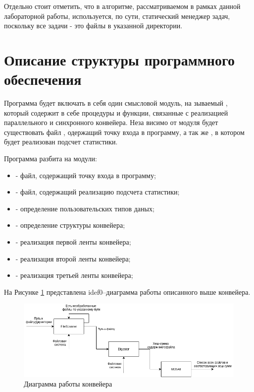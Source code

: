 Отдельно стоит отметить, что в алгоритме, рассматриваемом в рамках данной лабораторной работы,
используется, по сути, статический менеджер задач, поскольку все задачи - это файлы в указанной директории.


\section{Описание структуры программного обеспечения}

Программа будет включать в себя один смысловой модуль, на­
зываемый , который содержит в себе процедуры и функции,
связанные с реализацией параллельного и синхронного конвейера. Неза­
висимо от модуля будет существовать файл , одержащий точку входа в программу,
а так же , в котором будет реализован подсчет	статистики.

Программа разбита на модули:
\begin{itemize}
	\item {} - файл, содержащий точку входа в программу;
	\item {} - файл, содержащий реализацию подсчета статистики;
	\item {} - определение пользовательских типов даных;
	\item {} - определение структуры конвейера;
	\item {} - реализация первой ленты конвейера;
	\item {} - реализация второй ленты конвейера;
	\item {} - реализация третьей ленты конвейера;
\end{itemize}

На Рисунке \ref{pic:idef0} представлена idef0–диаграмма работы описанного выше конвейера.
\begin{figure}[!htb]
	\centering
	\includegraphics[scale=0.55]{imgs/5}
	\caption{Диаграмма работы конвейера}
	\label{pic:idef0}
\end{figure}


